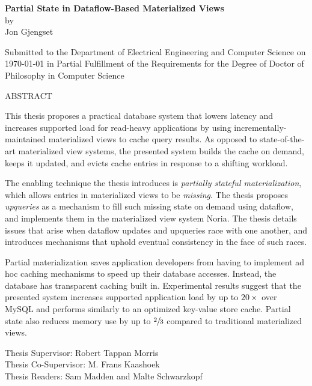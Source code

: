 \documentclass[fontsize=12pt,paper=letter]{scrartcl}
\begin{document}
\begin{titlepage}
  \begin{center}
    \textbf{\large Partial State in Dataflow-Based Materialized Views}\\
    \vspace{0.5\baselineskip}
    by\\
    \vspace{0.5\baselineskip}
    {\large Jon Gjengset}\\
    \vspace{0.5\baselineskip}
    \begin{addmargin}[0.15in]{0.15in}
      \centering
    Submitted to the Department of
    Electrical Engineering and Computer Science
    on \today{}
    in Partial Fulfillment of the Requirements for the Degree of
    Doctor of Philosophy in Computer Science
    \end{addmargin}
  \end{center}

  \begin{flushleft}
  ABSTRACT
  \vspace{0.5\baselineskip}

  This thesis proposes a practical database system that lowers latency and
    increases supported load for read-heavy applications by using
    incrementally-maintained materialized views to cache query results. As
    opposed to state-of-the-art materialized view systems, the presented system
    builds the cache on demand, keeps it updated, and evicts cache entries in
    response to a shifting workload.

  \vspace{0.5\baselineskip}

  The enabling technique the thesis introduces is \textit{partially stateful
    materialization}, which allows entries in materialized views to be
    \textit{missing}. The thesis proposes \textit{upqueries} as a mechanism to
    fill such missing state on demand using dataflow, and implements them in the
    materialized view system Noria. The thesis details issues that arise when
    dataflow updates and upqueries race with one another, and introduces
    mechanisms that uphold eventual consistency in the face of such races.

  \vspace{0.5\baselineskip}

  Partial materialization saves application developers from having to implement
    ad hoc caching mechanisms to speed up their database accesses. Instead, the
    database has transparent caching built in. Experimental results suggest that
    the presented system increases supported application load by up to
    $20\times$ over MySQL and performs similarly to an optimized key-value store
    cache. Partial state also reduces memory use by up to $\sfrac{2}{3}$
    compared to traditional materialized views.

  \vspace{\baselineskip}
  Thesis Supervisor: Robert Tappan Morris\\
  Thesis Co-Supervisor: M. Frans Kaashoek\\
  Thesis Readers: Sam Madden and Malte Schwarzkopf
  \end{flushleft}
\end{titlepage}
\end{document}
